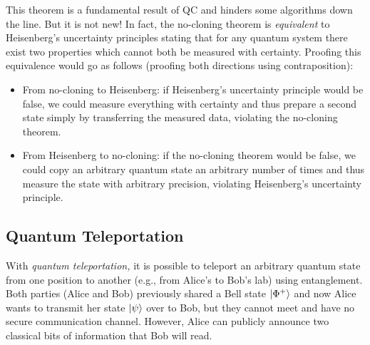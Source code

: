 			This theorem is a fundamental result of \ac{QC} and hinders some algorithms down the line. But it is not new! In fact, the no-cloning theorem is \emph{equivalent} to Heisenberg's uncertainty principles stating that for any quantum system there exist two properties which cannot both be measured with certainty. Proofing this equivalence would go as follows (proofing both directions using contraposition):
			\begin{itemize}
				\item From no-cloning to Heisenberg: if Heisenberg's uncertainty principle would be false, we could measure everything with certainty and thus prepare a second state simply by transferring the measured data, violating the no-cloning theorem.
				\item From Heisenberg to no-cloning: if the no-cloning theorem would be false, we could copy an arbitrary quantum state an arbitrary number of times and thus measure the state with arbitrary precision, violating Heisenberg's uncertainty principle.
			\end{itemize}

		\subsection{Quantum Teleportation}
			With \emph{quantum teleportation,} it is possible to teleport an arbitrary quantum state from one position to another (e.g., from Alice's to Bob's lab) using entanglement. Both parties (Alice and Bob) previously shared a Bell state \(\ket{\Phi^+}\) and now Alice wants to transmit her state \(\ket{\psi}\) over to Bob, but they cannot meet and have no secure communication channel. However, Alice can publicly announce two classical bits of information that Bob will read.

